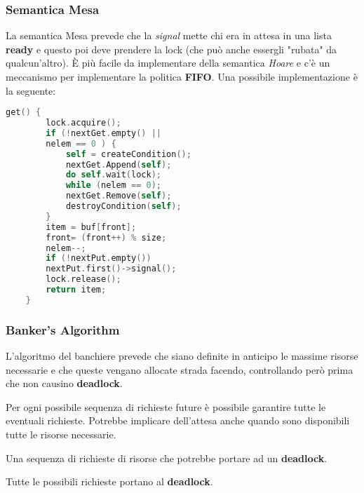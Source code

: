 \subsubsection{Semantica Mesa}
La semantica Mesa prevede che la \textit{signal} mette chi era in attesa in una lista \textbf{ready} e questo poi deve prendere la lock (che può anche essergli "rubata" da qualcun'altro). È più facile da implementare della semantica \textit{Hoare} e c'è un meccanismo per implementare la politica \textbf{FIFO}. Una possibile implementazione è la seguente:
\begin{lstlisting}[language=C]
	get() {
		lock.acquire();
		if (!nextGet.empty() ||
		nelem == 0 ) {
			self = createCondition();
			nextGet.Append(self);
			do self.wait(lock);
			while (nelem == 0);
			nextGet.Remove(self);
			destroyCondition(self);
		}
		item = buf[front];
		front= (front++) % size;
		nelem--;
		if (!nextPut.empty())
		nextPut.first()->signal();
		lock.release();
		return item;
	}
\end{lstlisting}


\subsubsection{Banker's Algorithm}
L'algoritmo del banchiere prevede che siano definite in anticipo le massime risorse necessarie e che queste vengano allocate strada facendo, controllando però prima che non causino \textbf{deadlock}.

\begin{definition}
	Per ogni possibile sequenza di richieste future è possibile garantire tutte le eventuali richieste. Potrebbe implicare dell'attesa anche quando sono disponibili tutte le risorse necessarie.
\end{definition}

\begin{definition}
	Una sequenza di richieste di risorse che potrebbe portare ad un \textbf{deadlock}.
\end{definition}

\begin{definition}
	Tutte le possibili richieste portano al \textbf{deadlock}.
\end{definition}

